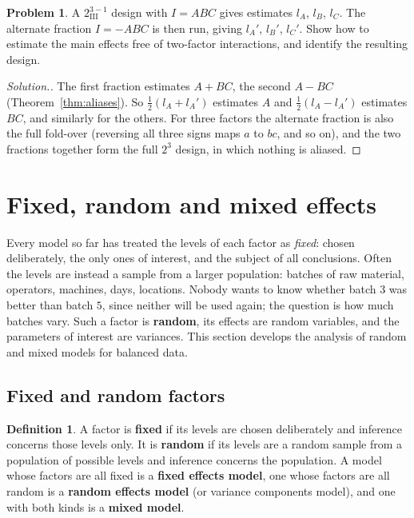 \documentclass[11pt,a4paper]{article}
\numberwithin{equation}{section}
\theoremstyle{definition}
\newtheorem{defn}[thm]{Definition}
\newtheorem{problemx}{Problem}[subsection]
\newenvironment{problem}{\begin{problemx}}{\end{problemx}}
\newenvironment{solution}
  {\renewcommand{\qedsymbol}{}\begin{proof}[\textit{Solution}.]}
  {\end{proof}}
\begin{document}
\begin{problem}
A $2^{3-1}_{\mathrm{III}}$ design with $I = ABC$ gives estimates $l_A$, $l_B$, $l_C$. The alternate fraction $I = -ABC$ is then run, giving $l_A'$, $l_B'$, $l_C'$. Show how to estimate the
main effects free of two-factor interactions, and identify the resulting design.
\end{problem}

\begin{solution}
The first fraction estimates $A + BC$, the second $A - BC$ (Theorem~\ref{thm:aliases}). So $\frac12(l_A + l_A')$ estimates $A$ and $\frac12(l_A - l_A')$ estimates $BC$, and similarly for
the others. For three factors the alternate fraction is also the full fold-over (reversing all three signs maps $a$ to $bc$, and so on), and the two
fractions together form the full $2^3$ design, in which nothing is aliased.
\end{solution}

\section{Fixed, random and mixed effects}\label{sec:random}
Every model so far has treated the levels of each factor as \emph{fixed}: chosen deliberately, the only ones of interest, and the subject of all
conclusions. Often the levels are instead a sample from a larger population: batches of raw material, operators, machines, days, locations. Nobody
wants to know whether batch $3$ was better than batch $5$, since neither will be used again; the question is how much batches vary. Such a factor is
\textbf{random}, its effects are random variables, and the parameters of interest are variances. This section develops the analysis of random and
mixed models for balanced data.

\subsection{Fixed and random factors}
\begin{defn}
A factor is \textbf{fixed} if its levels are chosen deliberately and inference concerns those levels only. It is \textbf{random} if its levels are a random
sample from a population of possible levels and inference concerns the population. A model whose factors are all fixed is a \textbf{fixed effects
model}, one whose factors are all random is a \textbf{random effects model} (or variance components model), and one with both kinds is a \textbf{mixed
model}.
\end{defn}
\end{document}
